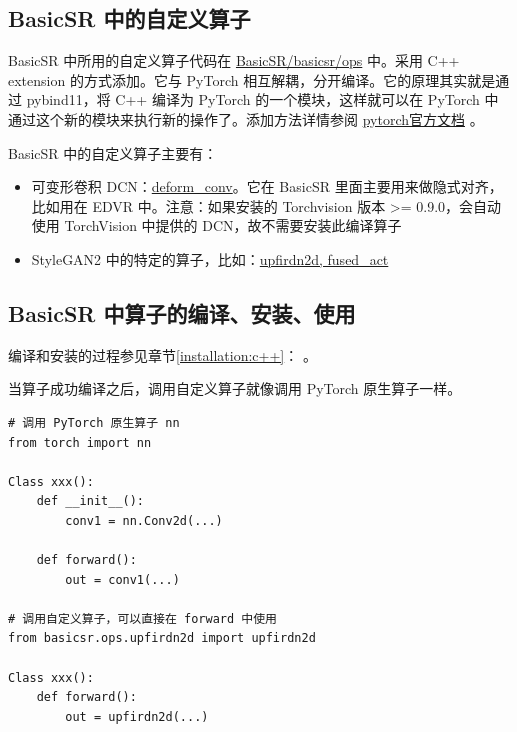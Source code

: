 \documentclass[../main.tex]{subfiles}
\begin{document}
\subsection{BasicSR 中的自定义算子}

BasicSR 中所用的自定义算子代码在 \href{https://github.com/XPixelGroup/BasicSR/tree/master/basicsr/ops}{BasicSR/basicsr/ops} 中。采用 C++ extension 的方式添加。它与 PyTorch 相互解耦，分开编译。它的原理其实就是通过 pybind11，将 C++ 编译为 PyTorch 的一个模块，这样就可以在 PyTorch 中通过这个新的模块来执行新的操作了。添加方法详情参阅 \href{https://pytorch.org/tutorials/advanced/cpp_extension.html#writing-a-mixed-c-cuda-extension}{pytorch官方文档} 。

BasicSR 中的自定义算子主要有：

\begin{itemize}
    \item 可变形卷积 DCN：\href{https://github.com/XPixelGroup/BasicSR/tree/master/basicsr/ops/dcn}{deform\_conv}。它在 BasicSR 里面主要用来做隐式对齐，比如用在 EDVR 中。注意：如果安装的 Torchvision 版本 >= 0.9.0，会自动使用 TorchVision 中提供的 DCN，故不需要安装此编译算子
    \item StyleGAN2 中的特定的算子，比如：\href{https://github.com/XPixelGroup/BasicSR/tree/master/basicsr/ops}{upfirdn2d, fused\_act}
\end{itemize}

\subsection{BasicSR 中算子的编译、安装、使用}

\begin{note} %
    编译和安装的过程参见章节\ref{installation:c++}： \label{installation:c++}。
\end{note}

当算子成功编译之后，调用自定义算子就像调用 PyTorch 原生算子一样。


\begin{verbatim}
# 调用 PyTorch 原生算子 nn
from torch import nn

Class xxx():
    def __init__():
        conv1 = nn.Conv2d(...)

    def forward():
        out = conv1(...)

# 调用自定义算子，可以直接在 forward 中使用
from basicsr.ops.upfirdn2d import upfirdn2d

Class xxx():
    def forward():
        out = upfirdn2d(...)

\end{verbatim}
\end{document}
